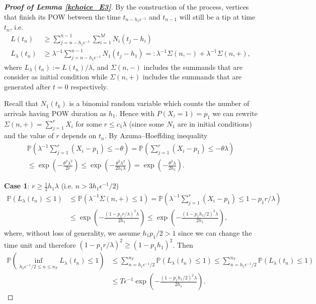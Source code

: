 \documentclass[12pt]{article}
\def\P{\mathbb{P}}
\numberwithin{equation}{section}  %
\begin{document}
\begin{proof}[\textbf{Proof of Lemma \ref{kchoice_E3}}]
By the construction of the process, vertices that finish its POW between the time $t_{n-h_1\epsilon^{-1}}$ and $t_{n-1}$ will still be a tip at time $t_n$, i.e.
\begin{align*}
L(t_{n})&\geq\sum_{j=n-h_1\epsilon^{-1}}^{n-1}\sum_{i=1}^{M} N_i(t_j-h_i)\\
L_{\lambda}(t_{n})&\geq\lambda^{-1}\sum_{j=n-h_1\epsilon^{-1}}^{n-1} N_1(t_j-h_1)=:\lambda^{-1}\Sigma(n,-)+\lambda^{-1}\Sigma(n,+),
\end{align*}
where $L_\lambda(t_n):=L(t_n)/\lambda$, and $\Sigma(n,-)$ includes the summands that are consider as initial condition while $\Sigma(n,+)$ includes the summands that are generated after $t=0$ respectively.

Recall that $N_1(t_k)$ is a binomial random variable which counts the number of arrivals having POW duration as $h_1$. Hence with $P(X_i=1)=p_1$ we can rewrite $\Sigma(n,+)=\sum_{j=1}^{r} X_i$ for some $r \leq c_1\lambda$ (since some $N_1$ are in initial conditions) and the value of $r$ depends on $t_n$.
By Azuma–Hoeffding inequality 
\begin{align*}
\P\left(\lambda^{-1}\sum_{j=1}^{r} (X_i-p_1)\leq -\theta\right)=\P\left(\sum_{j=1}^{r} (X_i-p_1)\leq -\theta\lambda\right)\\
\leq\exp\left(-\frac{\theta^2\lambda^2}{2r}\right)
\leq\exp\left(-\frac{\theta^2\lambda^2}{2h_1\lambda}\right)=\exp\left(-\frac{\theta^2\lambda}{2h_1}\right).
\end{align*}

 
\textbf{Case 1}: $r\geq \frac{1}{2}h_1\lambda$ (i.e. $n>3h_1\epsilon^{-1}/2$)
\begin{align*} 
\P({L_\lambda(t_n)\leq 1})&\leq\P({\lambda^{-1}\Sigma(n,+)\leq 1})=\P(\lambda^{-1}\sum_{j=1}^r(X_i-p_1)\leq 1-p_1r/\lambda)\\
&\leq\exp\left(-\frac{(1-p_1r/\lambda)^2\lambda}{2h_1}\right)\leq\exp\left(-\frac{(1-p_1h_1/2)^2\lambda}{2h_1}\right),
\end{align*} 
where, without loss of generality, we assume $h_1p_1/2>1$ since we can change the time unit and therefore $(1-p_1r/\lambda)^2\geq (1-p_1h_1)^2$.
Then
\begin{align*} 
\P(\inf_{h_1\epsilon^{-1}/2\leq n\leq n_T}L_\lambda(t_n)\leq 1)&\leq \sum_{n=h_1\epsilon^{-1}/2}^{n_T}\P(L_\lambda(t_n)\leq 1)\leq\sum_{n=h_1\epsilon^{-1}/2}^{n_T}\P(L_\lambda(t_n)\leq 1)\\
&\leq T\epsilon^{-1}\exp\left(-\frac{(1-p_1h_1/2)^2\lambda}{2h_1}\right).
\end{align*} 


\end{proof}
\end{document}
